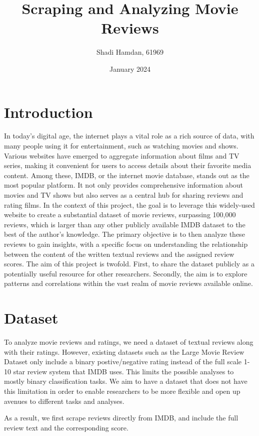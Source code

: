 \documentclass[12pt]{article}    %
\title{Scraping and Analyzing Movie Reviews}
\author{Shadi Hamdan, 61969}
\date{January 2024}
\begin{document}
\maketitle

\section{Introduction}

In today's digital age, the internet plays a vital role as a rich source of data, with many people using it for entertainment, such as watching movies and shows. Various websites have emerged to aggregate information about films and TV series, making it convenient for users to access details about their favorite media content. Among these, IMDB, or the internet movie database, stands out as the most popular platform. It not only provides comprehensive information about movies and TV shows but also serves as a central hub for sharing reviews and rating films. In the context of this project, the goal is to leverage this widely-used website to create a substantial dataset of movie reviews, surpassing 100,000 reviews, which is larger than any other publicly available IMDB dataset to the best of the author's knowledge. The primary objective is to then analyze these reviews to gain insights, with a specific focus on understanding the relationship between the content of the written textual reviews and the assigned review scores. The aim of this project is twofold. First, to share the dataset publicly as a potentially useful resource for other researchers. Secondly, the aim is to explore patterns and correlations within the vast realm of movie reviews available online.

\section{Dataset}

To analyze movie reviews and ratings, we need a dataset of textual reviews along with their ratings. However, existing datasets such as the Large Movie Review Dataset \cite{maas-EtAl:2011:ACL-HLT2011} only include a binary postive/negative rating instead of the full scale 1-10 star review system that IMDB uses. This limits the possible analyses to mostly binary classification tasks. We aim to have a dataset that does not have this limitation in order to enable researchers to be more flexible and open up avenues to different tasks and analyses.

As a result, we first scrape reviews directly from IMDB, and include the full review text and the corresponding score. 
\end{document}
